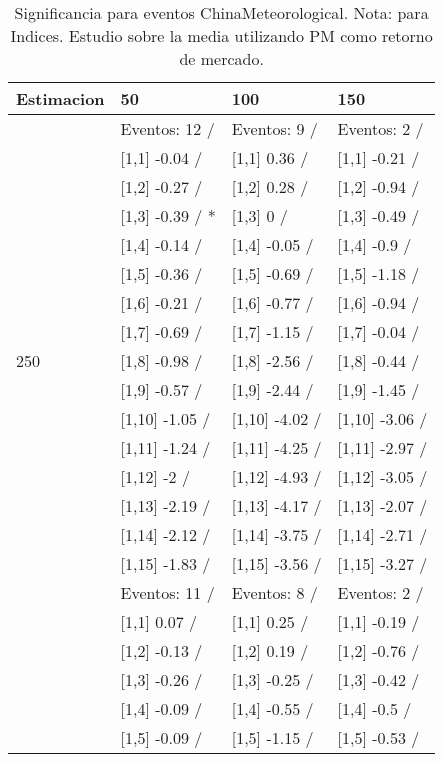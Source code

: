 \begin{table}

\caption{Significancia para eventos ChinaMeteorological. Nota: para Indices. Estudio sobre la media utilizando PM como retorno de mercado.}
\centering
\begin{tabular}[t]{llll}
\toprule
Estimacion & 50 & 100 & 150\\
\midrule
 & Eventos:  12 / & Eventos:  9 / & Eventos:  2 /\\
 & {}[1,1] -0.04  / & {}[1,1] 0.36  / & {}[1,1] -0.21  /\\
 & {}[1,2] -0.27  / & {}[1,2] 0.28  / & {}[1,2] -0.94  /\\
 & {}[1,3] -0.39  / * & {}[1,3] 0  / & {}[1,3] -0.49  /\\
 & {}[1,4] -0.14  / & {}[1,4] -0.05  / & {}[1,4] -0.9  /\\
\addlinespace
 & {}[1,5] -0.36  / & {}[1,5] -0.69  / & {}[1,5] -1.18  /\\
 & {}[1,6] -0.21  / & {}[1,6] -0.77  / & {}[1,6] -0.94  /\\
 & {}[1,7] -0.69  / & {}[1,7] -1.15  / & {}[1,7] -0.04  /\\
250 & {}[1,8] -0.98  / & {}[1,8] -2.56  / & {}[1,8] -0.44  /\\
 & {}[1,9] -0.57  / & {}[1,9] -2.44  / & {}[1,9] -1.45  /\\
\addlinespace
 & {}[1,10] -1.05  / & {}[1,10] -4.02  / & {}[1,10] -3.06  /\\
 & {}[1,11] -1.24  / & {}[1,11] -4.25  / & {}[1,11] -2.97  /\\
 & {}[1,12] -2  / & {}[1,12] -4.93  / & {}[1,12] -3.05  /\\
 & {}[1,13] -2.19  / & {}[1,13] -4.17  / & {}[1,13] -2.07  /\\
 & {}[1,14] -2.12  / & {}[1,14] -3.75  / & {}[1,14] -2.71  /\\
\addlinespace
 & {}[1,15] -1.83  / & {}[1,15] -3.56  / & {}[1,15] -3.27  /\\
 & Eventos:  11 / & Eventos:  8 / & Eventos:  2 /\\
 & {}[1,1] 0.07  / & {}[1,1] 0.25  / & {}[1,1] -0.19  /\\
 & {}[1,2] -0.13  / & {}[1,2] 0.19  / & {}[1,2] -0.76  /\\
 & {}[1,3] -0.26  / & {}[1,3] -0.25  / & {}[1,3] -0.42  /\\
\addlinespace
 & {}[1,4] -0.09  / & {}[1,4] -0.55  / & {}[1,4] -0.5  /\\
 & {}[1,5] -0.09  / & {}[1,5] -1.15  / & {}[1,5] -0.53  /\\

\end{tabular}
\end{table}
